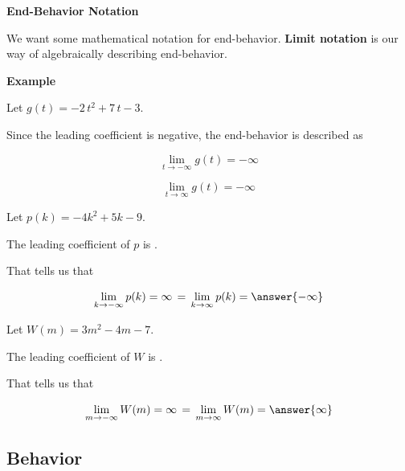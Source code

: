 \documentclass{ximera}
\begin{document}
\begin{notation} \textbf{\textcolor{red!50!green}{End-Behavior Notation}} 

We want some mathematical notation for end-behavior.  \textbf{Limit notation} is our way of algebraically describing end-behavior. 




\textbf{Example}

Let $g(t) = -2 \, t^2 + 7 \, t - 3$. 


Since the leading coefficient is negative, the end-behavior is described as 

\[
\lim\limits_{t \to -\infty} g(t) = -\infty
\]


\[
\lim\limits_{t \to \infty} g(t) = -\infty
\]






\end{notation}








\begin{question} 


Let $p(k) = -4 k^2 + 5 k - 9$.

The leading coefficient of $p$ is .

That tells us that


\[
\lim\limits_{k \to -\infty} p(k) = \infty \, = \,  \lim\limits_{k \to \infty} p(k) = \answer{-\infty}
\]


\end{question}








\begin{question} 


Let $W(m) = 3 m^2 - 4 m - 7$.

The leading coefficient of $W$ is .

That tells us that


\[
\lim\limits_{m \to -\infty} W(m) = \infty \, = \,  \lim\limits_{m \to \infty} W(m) = \answer{\infty}
\]


\end{question}





\subsection*{Behavior}
\end{document}
